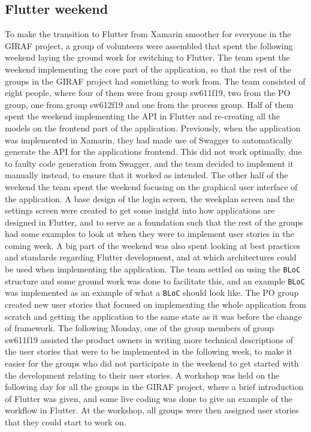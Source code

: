 \subsection{Flutter weekend}
To make the transition to Flutter from Xamarin smoother for everyone in the GIRAF project, a group of volunteers were assembled that spent the following weekend laying the ground work for switching to Flutter. 
The team spent the weekend implementing the core part of the application, so that the rest of the groups in the GIRAF project had something to work from. 
The team consisted of eight people, where four of them were from group sw611f19, two from the PO group, one from group sw612f19 and one from the process group.
Half of them spent the weekend implementing the API in Flutter and re-creating all the models on the frontend part of the application. 
Previously, when the application was implemented in Xamarin, they had made use of Swagger to automatically generate the API for the applications frontend.
This did not work optimally, due to faulty code generation from Swagger, and the team decided to implement it manually instead, to ensure that it worked as intended.
The other half of the weekend the team spent the weekend focusing on the graphical user interface of the application.
A base design of the login screen, the weekplan screen and the settings screen were created to get some insight into how applications are designed in Flutter, and to serve as a foundation such that the rest of the groups had some examples to look at when they were to implement user stories in the coming week.
A big part of the weekend was also spent looking at best practices and standards regarding Flutter development, and at which architectures could be used when implementing the application.
The team settled on using the \texttt{BLoC} structure and some ground work was done to facilitate this, and an example \texttt{BLoC} was implemented as an example of what a \texttt{BLoC} should look like.
The PO group created new user stories that focused on implementing the whole application from scratch and getting the application to the same state as it was before the change of framework.
The following Monday, one of the group members of group sw611f19 assisted the product owners in writing more technical descriptions of the user stories that were to be implemented in the following week, to make it easier for the groups who did not participate in the weekend to get started with the development relating to their user stories.
A workshop was held on the following day for all the groups in the GIRAF project, where a brief introduction of Flutter was given, and some live coding was done to give an example of the workflow in Flutter.
At the workshop, all groups were then assigned user stories that they could start to work on.

